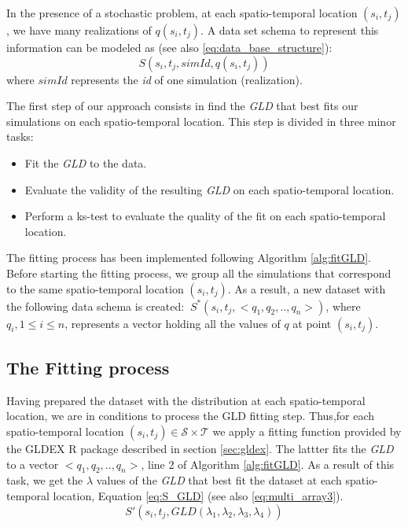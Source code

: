 In the presence of a stochastic problem, at each spatio-temporal location $(s_{i},t_{j})$, we have many realizations of $q(s_{i},t_{j})$. A data set schema to represent this information can be modeled as (see also \ref{eq:data_base_structure}):
\begin{equation}
S(s_{i},t_{j},simId,q(s_{i},t_{j}))
\end{equation}
where $simId$ represents the \textit{id} of one simulation (realization).

The first step of our approach consists in find the \textit{GLD} that best fits our simulations on each spatio-temporal location. This step is divided in three minor tasks:
\begin{itemize}
\item Fit the \textit{GLD} to the data.
\item Evaluate the validity of the resulting \textit{GLD} on each spatio-temporal location.
\item Perform a ks-test to evaluate the quality of the fit on each spatio-temporal location.
\end{itemize}

The fitting process has been implemented following Algorithm \ref{alg:fitGLD}. Before starting the fitting process, we group all the simulations that correspond to the same spatio-temporal location $(s_{i},t_{j})$.  As a result, a new dataset with the following data schema is created: $\ S^*(s_{i},t_{j},<q_1,q_2,..,q_n>)$, where $q_i, 1 \le i \le n$, represents a vector holding all the values of $q$ at point $(s_{i},t_{j})$.

\subsection{The Fitting process}
\label{gldFitProcess}
Having prepared the dataset with the distribution at each spatio-temporal location, we are in conditions to process the GLD fitting step. Thus,for each spatio-temporal location $(s_{i},t_{j}) \in \mathcal{S} \times \mathcal{T}$ we apply a fitting function provided by the GLDEX R package described in section \ref{sec:gldex}. The lattter fits the \textit{GLD} to a vector $<q_1,q_2,..,q_n>$, line 2 of Algorithm \ref{alg:fitGLD}. As a result of this task, we get the $\lambda$ values of the \textit{GLD} that best fit the dataset at each spatio-temporal location, Equation \ref{eq:S_GLD} (see also \ref{eq:multi_array3}).
\begin{equation}\label{eq:S_GLD}
S'(s_{i},t_{j},GLD(\lambda_{1}, \lambda_{2}, \lambda_{3}, \lambda_{4}))
\end{equation}

